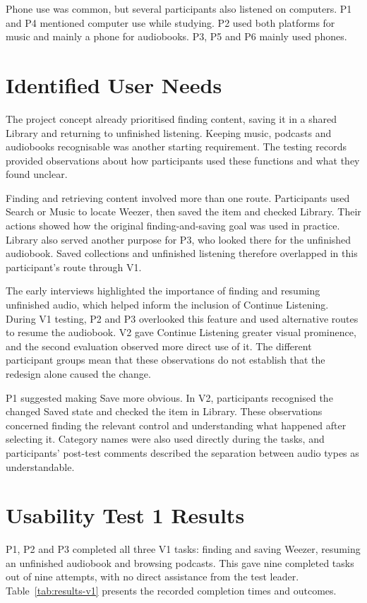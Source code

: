 Phone use was common, but several participants also listened on computers.
P1 and P4 mentioned computer use while studying. P2 used both platforms
for music and mainly a phone for audiobooks. P3, P5 and P6 mainly used
phones.

\section{Identified User Needs}
\label{sec:results-user-needs}

The project concept already prioritised finding content, saving it in a
shared Library and returning to unfinished listening. Keeping music,
podcasts and audiobooks recognisable was another starting requirement.
The testing records provided observations about how participants used
these functions and what they found unclear.

Finding and retrieving content involved more than one route. Participants
used Search or Music to locate Weezer, then saved the item and checked
Library. Their actions showed how the original finding-and-saving goal was
used in practice. Library also served another purpose for P3, who looked
there for the unfinished audiobook. Saved collections and unfinished
listening therefore overlapped in this participant's route through V1.

The early interviews highlighted the importance of finding and resuming
unfinished audio, which helped inform the inclusion of Continue Listening.
During V1 testing, P2 and P3 overlooked this feature and used alternative
routes to resume the audiobook. V2 gave Continue Listening greater visual
prominence, and the second evaluation observed more direct use of it.
The different participant groups mean that these observations do not
establish that the redesign alone caused the change.

P1 suggested making Save more obvious. In V2,
participants recognised the changed Saved state and checked the item in
Library. These observations concerned finding the relevant control and
understanding what happened after selecting it. Category names were also
used directly during the tasks, and participants' post-test comments
described the separation between audio types as understandable.

\section{Usability Test 1 Results}
\label{sec:results-v1}

P1, P2 and P3 completed all three V1 tasks: finding and saving Weezer,
resuming an unfinished audiobook and browsing podcasts. This gave nine
completed tasks out of nine attempts, with no direct assistance from the
test leader. Table~\ref{tab:results-v1} presents the recorded completion
times and outcomes.

